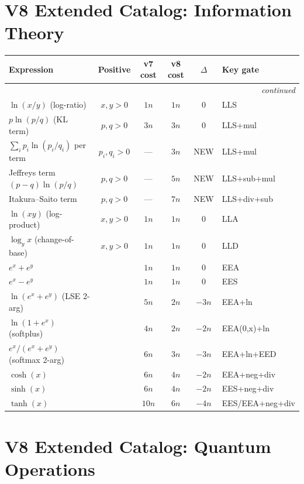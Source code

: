 \documentclass[11pt]{article}
\begin{document}
\section{V8 Extended Catalog: Information Theory}

\begin{longtable}{lccccl}
\toprule
Expression & Positive & v7 cost & v8 cost & $\Delta$ & Key gate \\
\midrule
\endhead
\midrule
\multicolumn{6}{r}{\textit{continued}} \\
\endfoot
\bottomrule
\endlastfoot
$\ln(x/y)$ (log-ratio) & $x,y>0$ & $1n$ & $1n$ & $0$ & LLS \\
$p\ln(p/q)$ (KL term) & $p,q>0$ & $3n$ & $3n$ & $0$ & LLS+mul \\
$\sum_i p_i\ln(p_i/q_i)$ per term & $p_i,q_i>0$ & --- & $3n$ & NEW & LLS+mul \\
Jeffreys term $(p-q)\ln(p/q)$ & $p,q>0$ & --- & $5n$ & NEW & LLS+sub+mul \\
Itakura--Saito term & $p,q>0$ & --- & $7n$ & NEW & LLS+div+sub \\
$\ln(xy)$ (log-product) & $x,y>0$ & $1n$ & $1n$ & $0$ & LLA \\
$\log_y x$ (change-of-base) & $x,y>0$ & $1n$ & $1n$ & $0$ & LLD \\
$e^x+e^y$ & & $1n$ & $1n$ & $0$ & EEA \\
$e^x-e^y$ & & $1n$ & $1n$ & $0$ & EES \\
$\ln(e^x+e^y)$ (LSE 2-arg) & & $5n$ & $2n$ & $-3n$ & EEA+ln \\
$\ln(1+e^x)$ (softplus) & & $4n$ & $2n$ & $-2n$ & EEA(0,x)+ln \\
$e^x/(e^x+e^y)$ (softmax 2-arg) & & $6n$ & $3n$ & $-3n$ & EEA+ln+EED \\
$\cosh(x)$ & & $6n$ & $4n$ & $-2n$ & EEA+neg+div \\
$\sinh(x)$ & & $6n$ & $4n$ & $-2n$ & EES+neg+div \\
$\tanh(x)$ & & $10n$ & $6n$ & $-4n$ & EES/EEA+neg+div \\
\end{longtable}

\section{V8 Extended Catalog: Quantum Operations}
\end{document}

